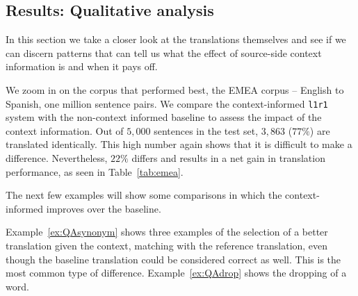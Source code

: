 \documentclass[smallextended]{svjour3}       %
\theoremstyle{break}
\begin{document}
\subsection{Results: Qualitative analysis}

In this section we take a closer look at the translations themselves and see if
we can discern patterns that can tell us what the effect of source-side context
information is and when it pays off.

We zoom in on the corpus that performed best, the EMEA corpus -- English to
Spanish, one million sentence pairs. We compare the context-informed
\texttt{l1r1} system with the non-context informed baseline to assess the
impact of the context information. Out of $5,000$ sentences in the test set,
$3,863$ ($77\%$) are translated identically. This high number again shows that
it is difficult to make a difference. Nevertheless, $22\%$ differs and results
in a net gain in translation performance, as seen in Table~\ref{tab:emea}.

The next few examples will show some comparisons in which the context-informed
improves over the baseline. 

Example~\ref{ex:QAsynonym} shows three examples of the selection of a better
translation given the context, matching with the reference translation, even
though the baseline translation could be considered correct as well. This is
the most common type of difference. Example~\ref{ex:QAdrop} shows the dropping
of a word.
\end{document}
